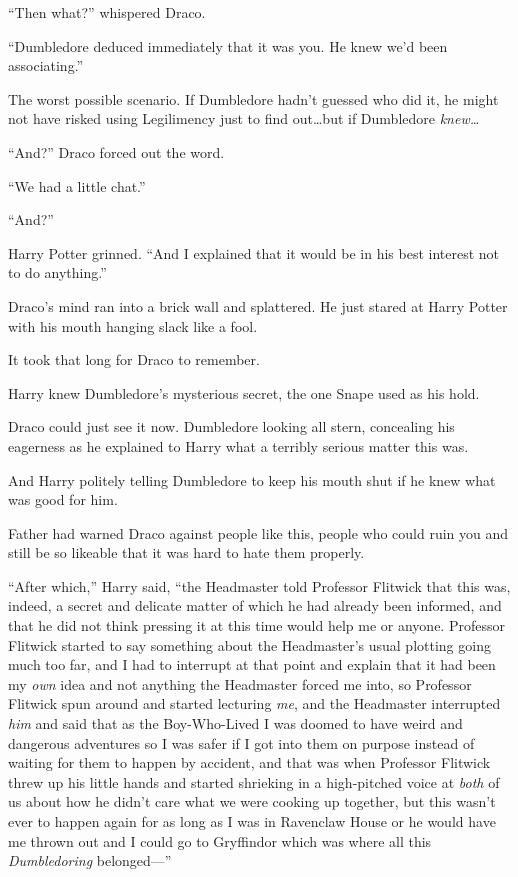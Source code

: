 “Then what?” whispered Draco.

“Dumbledore deduced immediately that it was you. He knew we’d been associating.”

The worst possible scenario. If Dumbledore hadn’t guessed who did it, he might not have risked using Legilimency just to find out…but if Dumbledore \emph{knew…}

“And?” Draco forced out the word.

“We had a little chat.”

“And?”

Harry Potter grinned. “And I explained that it would be in his best interest not to do anything.”

Draco’s mind ran into a brick wall and splattered. He just stared at Harry Potter with his mouth hanging slack like a fool.

It took that long for Draco to remember.

Harry knew Dumbledore’s mysterious secret, the one Snape used as his hold.

Draco could just see it now. Dumbledore looking all stern, concealing his eagerness as he explained to Harry what a terribly serious matter this was.

And Harry politely telling Dumbledore to keep his mouth shut if he knew what was good for him.

Father had warned Draco against people like this, people who could ruin you and still be so likeable that it was hard to hate them properly.

“After which,” Harry said, “the Headmaster told Professor Flitwick that this was, indeed, a secret and delicate matter of which he had already been informed, and that he did not think pressing it at this time would help me or anyone. Professor Flitwick started to say something about the Headmaster’s usual plotting going much too far, and I had to interrupt at that point and explain that it had been my \emph{own} idea and not anything the Headmaster forced me into, so Professor Flitwick spun around and started lecturing \emph{me}, and the Headmaster interrupted \emph{him} and said that as the Boy-Who-Lived I was doomed to have weird and dangerous adventures so I was safer if I got into them on purpose instead of waiting for them to happen by accident, and that was when Professor Flitwick threw up his little hands and started shrieking in a high-pitched voice at \emph{both} of us about how he didn’t care what we were cooking up together, but this wasn’t ever to happen again for as long as I was in Ravenclaw House or he would have me thrown out and I could go to Gryffindor which was where all this \emph{Dumbledoring} belonged—”

